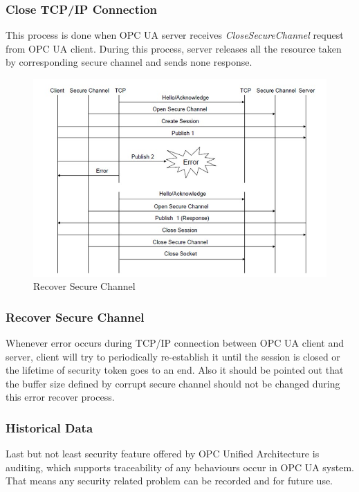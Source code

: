\documentclass[]{llncs}
\begin{document}
\subsubsection{Close TCP/IP Connection}
This process is done when OPC UA server receives \emph{CloseSecureChannel} request from OPC UA client. During this process, server releases all the resource taken by corresponding secure channel and sends none response.
\begin{figure}[ht]
	\centering
	\includegraphics[width=1\textwidth]{tcp_3.jpg}
		\caption[ ]{Recover Secure Channel\cite{O6}}
	\label{fig:tcp_3}
\end{figure}

\subsubsection{Recover Secure Channel}


Whenever error occurs during TCP/IP connection between OPC UA client and server, client will try to periodically re-establish it until the session is closed or the lifetime of security token goes to an end. Also it should be pointed out that the buffer size defined by corrupt secure channel should not be changed during this error recover process.

\subsubsection{Historical Data}
Last but not least security feature offered by OPC Unified Architecture is auditing, which supports traceability of any behaviours occur in OPC UA system. That means any security related problem can be recorded and for future use.
\end{document}
